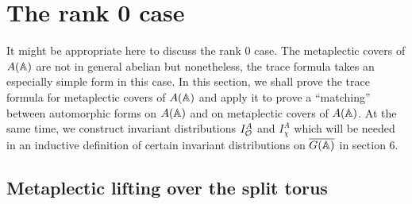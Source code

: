 \section{The rank 0 case}

It might be appropriate here to discuss the rank 0 case. The metaplectic
covers of $A(\Bbb{A})$ are not in general abelian but nonetheless, the
trace formula takes an especially simple form in this case. In this section,
we shall prove the trace formula for metaplectic covers of $A({\Bbb{A}})$ and
apply it to prove a ``matching'' between automorphic forms on $A({\Bbb{A}})$
and on metaplectic covers of $A({\Bbb{A}})$. At the same time, we construct
invariant distributions $I_{\cal{O}}^A$ and $I_\chi ^A$ which will be
needed in an inductive definition of certain invariant distributions
on $\overline{G({\Bbb{A}})}$ in section 6. 

\subsection{Metaplectic lifting over the split torus}

